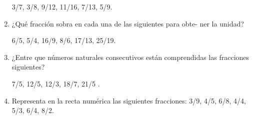 \documentclass[10pt,twoside]{article}
\begin{document}
\begin{enumerate}
3/7, 3/8, 9/12, 11/16, 7/13, 5/9.
\item ¿Qué fracción sobra en cada una de las siguientes para obte-
ner la unidad?

6/5, 5/4, 16/9, 8/6, 17/13, 25/19.
\item ¿Entre que números naturales consecutivos están comprendidas las fracciones siguientes? 

7/5, 12/5, 12/3, 18/7, 21/5 .
\item Representa en la recta numérica las siguientes fracciones:
3/9, 4/5, 6/8, 4/4, 5/3, 6/4, 8/2.
\end{enumerate}
\end{document}
